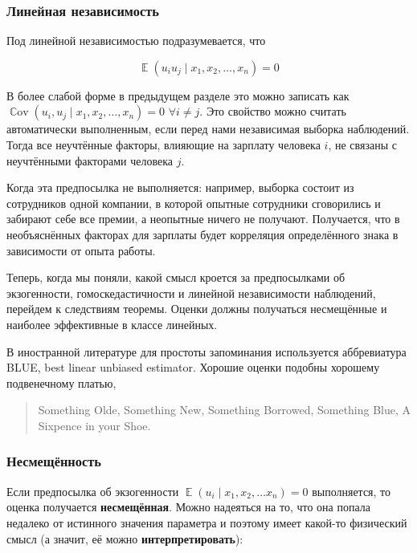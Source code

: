 \documentclass[12pt]{article}
\DeclareMathOperator{\Cov}{\mathbb{C}ov}
\DeclareMathOperator{\E}{\mathbb{E}}
\begin{document}
\subsubsection*{Линейная независимость}

Под линейной независимостью подразумевается, что

\[ \E(u_i u_j \mid x_1, x_2, \dots, x_n) = 0\]

В более слабой форме в предыдущем разделе это можно записать как $\Cov(u_i, u_j \mid x_1, x_2, \dots, x_n) = 0$  $\forall i \neq j.$ Это свойство можно считать автоматически выполненным, если перед нами независимая выборка наблюдений. Тогда все неучтённые факторы, влияющие на зарплату человека $i$, не связаны с неучтёнными факторами человека $j$. 

Когда эта предпосылка не выполняется: например, выборка состоит из сотрудников одной компании, в которой опытные сотрудники сговорились и забирают себе все премии, а неопытные ничего не получают. Получается, что в необъяснённых факторах для зарплаты будет корреляция определённого знака в зависимости от опыта работы.


Теперь, когда мы поняли, какой смысл кроется за предпосылками об экзогенности, гомоскедастичности и линейной независимости наблюдений, перейдем к следствиям теоремы. Оценки должны получаться несмещённые и наиболее эффективные в классе линейных.


В иностранной литературе для простоты запоминания используется аббревиатура BLUE, best linear unbiased estimator. Хорошие оценки подобны хорошему подвенечному платью,
\begin{quotation}
Something Olde, Something New, Something Borrowed, Something Blue, A Sixpence in your Shoe.    
\end{quotation}

\subsubsection*{Несмещённость}

Если предпосылка об экзогенности $\E(u_i \mid x_1, x_2, \ldots x_n) = 0$ выполняется, то оценка получается \textbf{несмещённая}. Можно надеяться на то, что она попала недалеко от истинного значения параметра и поэтому имеет какой-то физический смысл (а значит, её можно \textbf{интерпретировать}):
\end{document}
